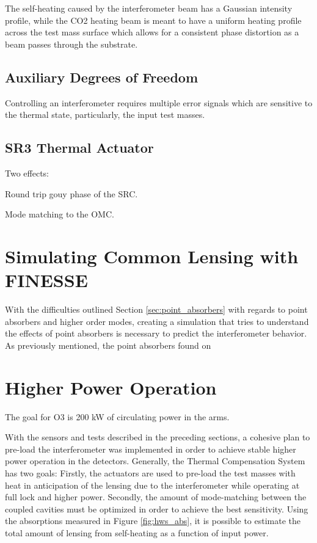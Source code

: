 	The self-heating caused by the interferometer beam has a Gaussian intensity profile, while the CO2 heating beam is meant to have a uniform heating profile across the test mass surface which allows for a consistent phase distortion as a beam passes through the substrate.
	
	\subsection{Auxiliary Degrees of Freedom}
	Controlling an interferometer requires multiple error signals which are sensitive to the thermal state, particularly, the input test masses.
	
	\subsection{SR3 Thermal Actuator}
	
	Two effects:

	Round trip gouy phase of the SRC.
	
	Mode matching to the OMC.
	
\section{Simulating Common Lensing with FINESSE}
	With the difficulties outlined Section \ref{sec:point_absorbers} with regards to point absorbers and higher order modes, creating a simulation that tries to understand the effects of point absorbers is necessary to predict the interferometer behavior. As previously mentioned, the point absorbers found on 
	
	
\section{Higher Power Operation}
	The goal for O3 is 200 kW of circulating power in the arms.
	
	With the sensors and tests described in the preceding sections, a cohesive plan to pre-load the interferometer was implemented in order to achieve stable higher power operation in the detectors.  Generally, the Thermal Compensation System has two goals: Firstly, the actuators are used to pre-load the test masses with heat in anticipation of the lensing due to the interferometer while operating at full lock and higher power.  Secondly, the amount of mode-matching between the coupled cavities must be optimized in order to achieve the best sensitivity.  Using the absorptions measured in Figure \ref{fig:hws_abs}, it is possible to estimate the total amount of lensing from self-heating as a function of input power.
	
